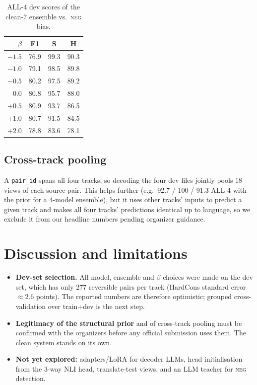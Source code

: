 \documentclass[11pt,a4paper]{article}
\newcommand{\NEG}{\textsc{neg}}
\begin{document}
\begin{table}[h]
\centering\small
\begin{tabular}{rccc}
\toprule
$\beta$ & F1 & S & H \\
\midrule
$-1.5$ & 76.9 & 99.3 & 90.3 \\
$-1.0$ & 79.1 & 98.5 & 89.8 \\
$-0.5$ & 80.2 & 97.5 & 89.2 \\
$0.0$  & 80.8 & 95.7 & 88.0 \\
$+0.5$ & 80.9 & 93.7 & 86.5 \\
$+1.0$ & 80.7 & 91.5 & 84.5 \\
$+2.0$ & 78.8 & 83.6 & 78.1 \\
\bottomrule
\end{tabular}
\caption{ALL-4 dev scores of the clean-7 ensemble vs.\ \NEG{} bias.}
\label{tab:bias}
\end{table}

\subsection{Cross-track pooling}
A \texttt{pair\_id} spans all four tracks, so decoding the four dev files jointly
pools 18 views of each source pair. This helps further (e.g.\ 92.7 / 100 / 91.3
ALL-4 with the prior for a 4-model ensemble), but it uses other tracks' inputs
to predict a given track and makes all four tracks' predictions identical up to
language, so we exclude it from our headline numbers pending organizer guidance.

\section{Discussion and limitations}
\begin{itemize}
\item \textbf{Dev-set selection.} All model, ensemble and $\beta$ choices were
  made on the dev set, which has only 277 reversible pairs per track
  (HardCons standard error $\approx$2.6 points). The reported numbers are
  therefore optimistic; grouped cross-validation over train+dev is the next step.
\item \textbf{Legitimacy of the structural prior} and of cross-track pooling
  must be confirmed with the organizers before any official submission uses
  them. The clean system stands on its own.
\item \textbf{Not yet explored:} adapters/LoRA for decoder LLMs, head
  initialisation from the 3-way NLI head, translate-test views, and an
  LLM teacher for \NEG{} detection.
\end{itemize}
\end{document}
